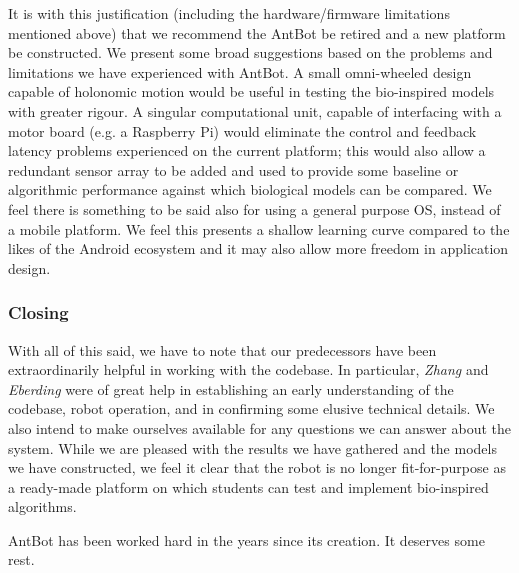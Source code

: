 \documentclass[a4paper,11pt,twoside,openright]{article}
\begin{document}
It is with this justification (including the hardware/firmware
limitations mentioned above) that we recommend the AntBot be retired
and a new platform be constructed. We present some broad suggestions
based on the problems and limitations we have experienced with
AntBot. A small omni-wheeled design capable of holonomic motion would
be useful in testing the bio-inspired models with greater rigour. A
singular computational unit, capable of interfacing with a motor board
(e.g. a Raspberry Pi) would eliminate the control and feedback latency
problems experienced on the current platform; this would also allow a
redundant sensor array to be added and used to provide some baseline
or algorithmic performance against which biological models can be
compared. We feel there is something to be said also for using a
general purpose OS, instead of a mobile platform. We feel this
presents a shallow learning curve compared to the likes of the Android
ecosystem and it may also allow more freedom in application
design.

\subsubsection{Closing}
With all of this said, we have to note that our predecessors have been
extraordinarily helpful in working with the codebase. In particular,
\textit{Zhang} and \textit{Eberding} were of great help in
establishing an early understanding of the codebase, robot operation,
and in confirming some elusive technical details. We also intend to
make ourselves available for any questions we can answer about the
system. While we are pleased with the results we have gathered and the
models we have constructed, we feel it clear that the robot is no longer
fit-for-purpose as a ready-made platform on which students can test
and implement bio-inspired algorithms.
\newline\par

AntBot has been worked hard in the years since its creation. It
deserves some rest.



\end{document}
